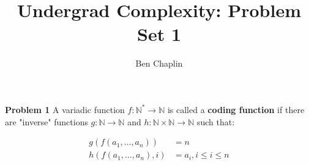 \documentclass[11pt]{article}
\title{Undergrad Complexity: Problem Set 1}
\author{Ben Chaplin}
\date{}
\theoremstyle{plain}
\theoremstyle{definition}
\newcommand{\N}{\mathbb{N}}
\begin{document}
\maketitle

{\bf Problem 1}
A variadic function $f: \N^* \rightarrow \N$ is called a {\bf coding function} if there are "inverse" functions
$g: \N \rightarrow \N$ and $h: \N \times \N \rightarrow \N$ such that:

\begin{align*}
	g(f(a_1, \ldots, a_n))    & = n                    \\
	h(f(a_1, \ldots, a_n), i) & = a_i, i \leq i \leq n
\end{align*}
\end{document}
